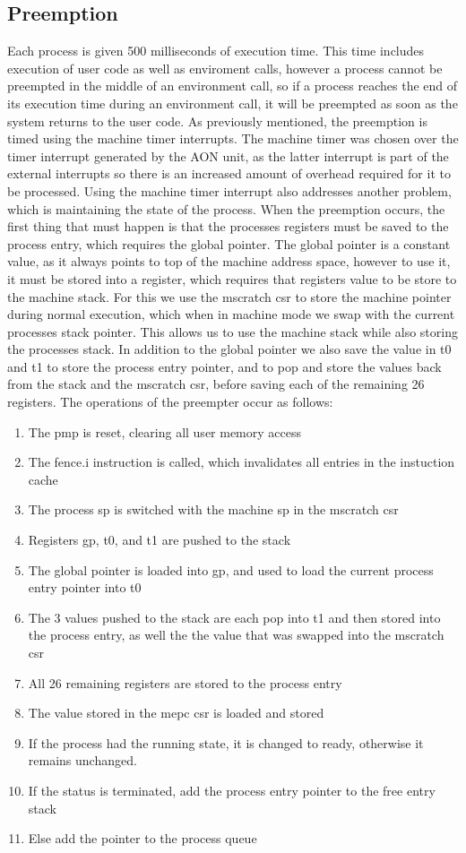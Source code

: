 \subsection{Preemption}
Each process is given 500 milliseconds of execution time. This time includes execution of user code as well as enviroment calls, however a process cannot be preempted in the middle of an environment call, so if a process reaches the end of its execution time during an environment call, it will be preempted as soon as the system returns to the user code. As previously mentioned, the preemption is timed using the machine timer interrupts. The machine timer was chosen over the timer interrupt generated by the AON unit, as the latter interrupt is part of the external interrupts so there is an increased amount of overhead required for it to be processed. Using the machine timer interrupt also addresses another problem, which is maintaining the state of the process. When the preemption occurs, the first thing that must happen is that the processes registers must be saved to the process entry, which requires the global pointer. The global pointer is a constant value, as it always points to top of the machine address space, however to use it, it must be stored into a register, which requires that registers value to be store to the machine stack. For this we use the mscratch csr to store the machine pointer during normal execution, which when in machine mode we swap with the current processes stack pointer. This allows us to use the machine stack while also storing the processes stack. In addition to the global pointer we also save the value in t0 and t1 to store the process entry pointer, and to pop and store the values back from the stack and the mscratch csr, before saving each of the remaining 26 registers. The operations of the preempter occur as follows:
\begin{enumerate}
    \item The \ac{pmp} is reset, clearing all user memory access
    \item The fence.i instruction is called, which invalidates all entries in the instuction cache
    \item The process sp is switched with the machine sp in the mscratch csr
    \item Registers gp, t0, and t1 are pushed to the stack
    \item The global pointer is loaded into gp, and used to load the current process entry pointer into t0
    \item The 3 values pushed to the stack are each pop into t1 and then stored into the process entry, as well the the value that was swapped into the mscratch csr
    \item All 26 remaining registers are stored to the process entry
    \item The value stored in the mepc csr is loaded and stored
    \item If the process had the running state, it is changed to ready, otherwise it remains unchanged.
    \item If the status is terminated, add the process entry pointer to the free entry stack
    \item Else add the pointer to the process queue
\end{enumerate}
